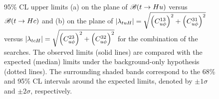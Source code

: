 \begin{figure}[t!]
\begin{center}
\caption{\small {95\% CL upper limits (a) on the plane of $\mathscr{B}(t\to Hu)$ versus $\mathscr{B}(t\to Hc)$ and (b) on the plane 
of $|\lambda_{tuH}|=\sqrt{\left(C_{u \phi}^{1 3}\right)^{2}+\left(C_{u \phi}^{3 1}\right)^{2}}$ versus $|\lambda_{tcH}|=\sqrt{\left(C_{u \phi}^{2 3}\right)^{2}+\left(C_{u \phi}^{3 2}\right)^{2}}$ for the combination of the searches. The observed limits (solid lines) are compared with the expected (median) limits under the background-only hypothesis (dotted lines). The surrounding shaded bands correspond to the 68\% and 95\% CL intervals around the expected limits, 
denoted by $\pm 1\sigma$ and $\pm 2\sigma$, respectively.}}
\label{fig:limits_combo_2D} 
\end{center}
\end{figure}

